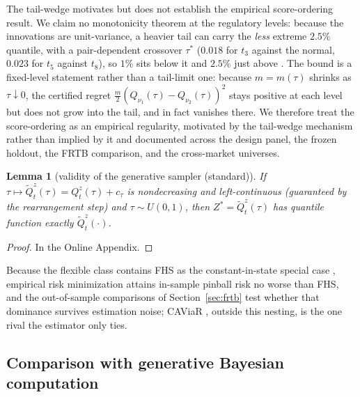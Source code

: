 \documentclass[11pt]{article}
\newtheorem{lemma}{Lemma}
\theoremstyle{remark}
\begin{document}
\medskip\noindent The tail-wedge motivates but does not establish the empirical score-ordering result. We claim no monotonicity theorem at the regulatory levels: because the innovations are unit-variance, a heavier tail can carry the \emph{less} extreme $2.5\%$ quantile, with a pair-dependent crossover $\tau^*$ ($0.018$ for $t_3$ against the normal, $0.023$ for $t_5$ against $t_8$), so $1\%$ sits below it and $2.5\%$ just above \citep{patton2020}. The bound is a fixed-level statement rather than a tail-limit one: because $m=m(\tau)$ shrinks as $\tau\downarrow0$, the certified regret $\tfrac{m}{2}(Q_{\nu_1}(\tau) - Q_{\nu_2}(\tau))^2$ stays positive at each level but does not grow into the tail, and in fact vanishes there. We therefore treat the score-ordering as an empirical regularity, motivated by the tail-wedge mechanism rather than implied by it and documented across the design panel, the frozen holdout, the FRTB comparison, and the cross-market universes.

\begin{lemma}[validity of the generative sampler (standard)]\label{lem:sampler}
If $\tau \mapsto \widetilde{Q}^{z}_t(\tau) = Q^{z}_t(\tau)+c_\tau$ is nondecreasing and
left-continuous (guaranteed by the rearrangement step) and
$\tau \sim U(0,1)$, then $Z^* = \widetilde{Q}^{z}_t(\tau)$ has
quantile function exactly $\widetilde{Q}^{z}_t(\cdot)$.
\end{lemma}
\begin{proof} In the Online Appendix. \end{proof}

\medskip\noindent Because the flexible class contains FHS as the constant-in-state special case \citep{baroneadesi1999fhs}, empirical risk minimization attains in-sample pinball risk no worse than FHS, and the out-of-sample comparisons of Section~\ref{sec:frtb} test whether that dominance survives estimation noise; CAViaR \citep{engle2004caviar}, outside this nesting, is the one rival the estimator only ties.

\subsection{Comparison with generative Bayesian computation}\label{sec:polsondelta}
\end{document}
